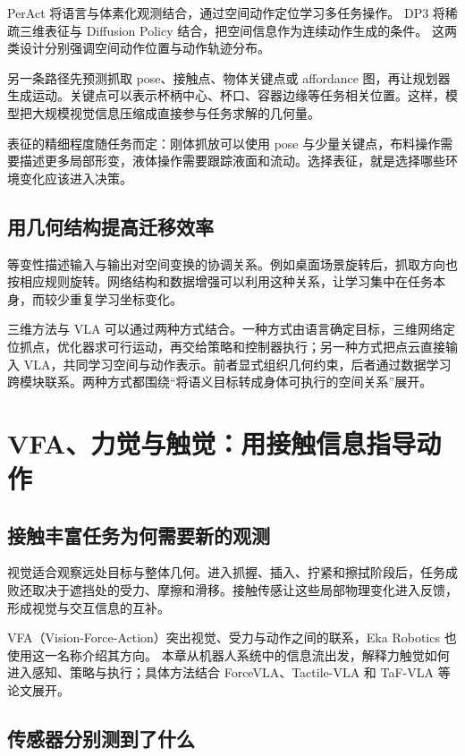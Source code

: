 \documentclass[UTF8,a4paper,11pt,oneside,openany,fontset=none]{ctexbook}
\begin{document}
PerAct 将语言与体素化观测结合，通过空间动作定位学习多任务操作。\cite{R15} DP3 将稀疏三维表征与 Diffusion Policy 结合，把空间信息作为连续动作生成的条件。\cite{R16} 这两类设计分别强调空间动作位置与动作轨迹分布。

另一条路径先预测抓取 pose、接触点、物体关键点或 affordance 图，再让规划器生成运动。关键点可以表示杯柄中心、杯口、容器边缘等任务相关位置。这样，模型把大规模视觉信息压缩成直接参与任务求解的几何量。

表征的精细程度随任务而定：刚体抓放可以使用 pose 与少量关键点，布料操作需要描述更多局部形变，液体操作需要跟踪液面和流动。选择表征，就是选择哪些环境变化应该进入决策。

\section{用几何结构提高迁移效率}

等变性描述输入与输出对空间变换的协调关系。例如桌面场景旋转后，抓取方向也按相应规则旋转。网络结构和数据增强可以利用这种关系，让学习集中在任务本身，而较少重复学习坐标变化。

三维方法与 VLA 可以通过两种方式结合。一种方式由语言确定目标，三维网络定位抓点，优化器求可行运动，再交给策略和控制器执行；另一种方式把点云直接输入 VLA，共同学习空间与动作表示。前者显式组织几何约束，后者通过数据学习跨模块联系。两种方式都围绕``将语义目标转成身体可执行的空间关系''展开。

\chapter{VFA、力觉与触觉：用接触信息指导动作}

\section{接触丰富任务为何需要新的观测}

视觉适合观察远处目标与整体几何。进入抓握、插入、拧紧和擦拭阶段后，任务成败还取决于遮挡处的受力、摩擦和滑移。接触传感让这些局部物理变化进入反馈，形成视觉与交互信息的互补。

VFA（Vision-Force-Action）突出视觉、受力与动作之间的联系，Eka Robotics 也使用这一名称介绍其方向。\cite{R17} 本章从机器人系统中的信息流出发，解释力触觉如何进入感知、策略与执行；具体方法结合 ForceVLA、Tactile-VLA 和 TaF-VLA 等论文展开。\cite{R18}\cite{R19}\cite{R20}

\section{传感器分别测到了什么}
\end{document}
